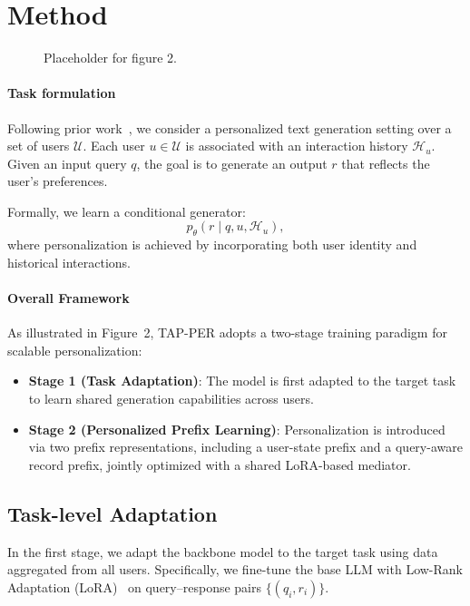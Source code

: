 \documentclass[11pt]{article}
\begin{document}
\section{Method}

\begin{figure}[t]
    \centering
    \caption{Placeholder for figure 2.}
    \label{fig:method}
\end{figure}
\paragraph{Task formulation}
Following prior work~\cite{tan2024democratizing}, we consider a personalized text generation setting over a set of users $\mathcal{U}$. Each user $u \in \mathcal{U}$ is associated with an interaction history $\mathcal{H}_u$. Given an input query $q$, the goal is to generate an output $r$ that reflects the user's preferences.

Formally, we learn a conditional generator:
\[
p_\theta(r \mid q, u, \mathcal{H}_u),
\]
where personalization is achieved by incorporating both user identity and historical interactions.
\paragraph{Overall Framework}
As illustrated in Figure~2, TAP-PER adopts a two-stage training paradigm for scalable personalization:

\begin{itemize}
    \item \textbf{Stage 1 (Task Adaptation)}: 
    The model is first adapted to the target task to learn shared generation capabilities across users.

    \item \textbf{Stage 2 (Personalized Prefix Learning)}: 
    Personalization is introduced via two prefix representations, including a user-state prefix and a query-aware record prefix, jointly optimized with a shared LoRA-based mediator.
\end{itemize}
\subsection{Task-level Adaptation}

In the first stage, we adapt the backbone model to the target task using data aggregated from all users. Specifically, we fine-tune the base LLM with Low-Rank Adaptation (LoRA)~\cite{hu2022lora} on query--response pairs $\{(q_i, r_i)\}$.
\end{document}
